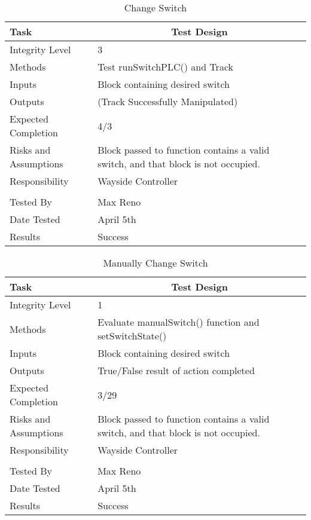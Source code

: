 \documentclass[]{article}
\begin{document}
	
	\begin{table}[H]
		\centering
		\caption{Change Switch}
		\begin{tabular}{|l|l|}
			\hline
			Task & \multicolumn{1}{c|}{Test Design} \\ \hline
			Integrity Level & 3 \\ \hline
			Methods & Test runSwitchPLC() and Track\\ \hline
			Inputs &  Block containing desired switch\\ \hline
			Outputs &  (Track Successfully Manipulated)\\ \hline
			Expected Completion & 4/3 \\ \hline
			Risks and Assumptions & \parbox[t]{10cm}{Block passed to function contains a valid switch, and that block is not occupied.} \\ \hline
			Responsibility & Wayside Controller\\ \hline
			\\ \hline
			Tested By   &  Max Reno\\	\hline
			Date Tested & \parbox[t]{10cm}{April 5th}\\ \hline
			Results & Success\\ \hline
		\end{tabular}
	\end{table}
	
	\begin{table}[H]
		\centering
		\caption{Manually Change Switch}
		\begin{tabular}{|l|l|}
			\hline
			Task & \multicolumn{1}{c|}{Test Design} \\ \hline
			Integrity Level & 1 \\ \hline
			Methods & Evaluate manualSwitch() function and setSwitchState()\\ \hline
			Inputs &  Block containing desired switch\\ \hline
			Outputs &  True/False result of action completed\\ \hline
			Expected Completion & 3/29 \\ \hline
			Risks and Assumptions & \parbox[t]{10cm}{Block passed to function contains a valid switch, and that block is not occupied.} \\ \hline
			Responsibility & Wayside Controller\\ \hline
			\\ \hline
			Tested By   &  Max Reno\\	\hline
			Date Tested & \parbox[t]{10cm}{April 5th}\\ \hline
			Results & Success\\ \hline
		\end{tabular}
	\end{table}
\end{document}
